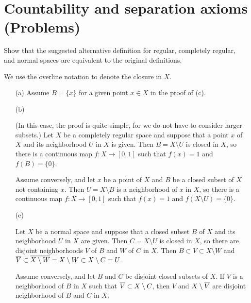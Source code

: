 \section{Countability and separation axioms (Problems)}

\begin{prob}\label{separability equivalences}
    Show that the suggested alternative definition for regular, completely regular, and normal spaces are equivalent to the original definitions.
\end{prob}
\begin{sol}
    We use the overline notation to denote the closure in $X$.
    \begin{enumerate}
        \item[(a)]
        {
            Assume $B=\{x\}$ for a given point $x\in X$ in the proof of (c).
        }
        \item[(b)]
        {
            (In this case, the proof is quite simple, for we do not have to consider larger subsets.)
            Let $X$ be a completely regular space and suppose that a point $x$ of $X$ and its neighborhood $U$ in $X$ is given.
            Then $B=X\setminus U$ is closed in $X$, so there is a continuous map $f: X\rightarrow [0, 1]$ such that $f(x)=1$ and $f(B)=\{0\}$.

            Assume conversely, and let $x$ be a point of $X$ and $B$ be a closed subset of $X$ not containing $x$.
            Then $U=X\setminus B$ is a neighborhood of $x$ in $X$, so there is a continuous map $f: X\rightarrow [0, 1]$ such that $f(x)=1$ and $f(X\setminus U)=\{0\}$.
        }
        \item[(c)]
        {
            Let $X$ be a normal space and suppose that a closed subset $B$ of $X$ and its neighborhood $U$ in $X$ are given.
            Then $C=X\setminus U$ is closed in $X$, so there are disjoint neighborhoods $V$ of $B$ and $W$ of $C$ in $X$.
            Then $B\subset V\subset X\setminus W$ and $\overline{V}\subset\overline{X\setminus W}=X\setminus W\subset X\setminus C=U$.

            Assume conversely, and let $B$ and $C$ be disjoint closed subsets of $X$.
            If $V$ is a neighborhood of $B$ in $X$ such that $\overline{V}\subset X\setminus C$, then $V$ and $X\setminus\overline{V}$ are disjoint neighborhood of $B$ and $C$ in $X$.
        }
    \end{enumerate}   
\end{sol}

\color{red}
\begin{prob}
    
\end{prob}
\begin{sol}
    
\end{sol}
\color{black}

